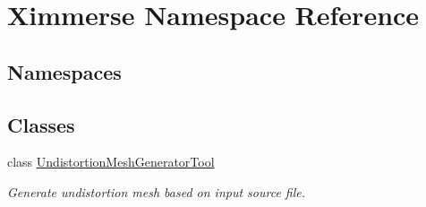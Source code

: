 \hypertarget{namespace_ximmerse}{}\section{Ximmerse Namespace Reference}
\label{namespace_ximmerse}
\subsection*{Namespaces}
\begin{DoxyCompactItemize}
\end{DoxyCompactItemize}
\subsection*{Classes}
\begin{DoxyCompactItemize}
\item 
class \mbox{\hyperlink{class_ximmerse_1_1_undistortion_mesh_generator_tool}{Undistortion\+Mesh\+Generator\+Tool}}
\begin{DoxyCompactList}\small\item\em Generate undistortion mesh based on input source file. \end{DoxyCompactList}\end{DoxyCompactItemize}
